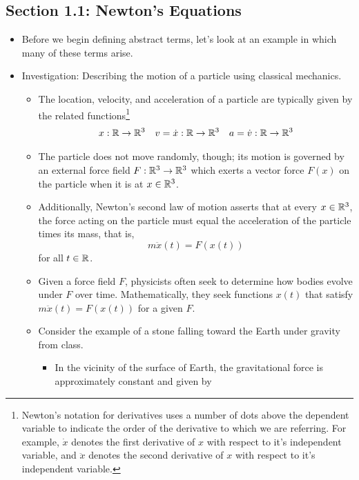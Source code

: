 \documentclass[../notes.tex]{subfiles}
\begin{document}
\subsection*{Section 1.1: Newton's Equations}
\begin{itemize}
    \item {}Before we begin defining abstract terms, let's look at an example in which many of these terms arise.
    \item Investigation: Describing the motion of a particle using classical mechanics.
    \begin{itemize}
        \item The location, velocity, and acceleration of a particle are typically given by the related functions\footnote{Newton's notation for derivatives uses a number of dots above the dependent variable to indicate the order of the derivative to which we are referring. For example, $\dot{x}$ denotes the first derivative of $x$ with respect to it's independent variable, and $\ddot{x}$ denotes the second derivative of $x$ with respect to it's independent variable.}
        \begin{align*}
            x:\mathbb{R}\to\mathbb{R}^3&&
            v=\dot{x}:\mathbb{R}\to\mathbb{R}^3&&
            a=\dot{v}:\mathbb{R}\to\mathbb{R}^3
        \end{align*}
        \item The particle does not move randomly, though; its motion is governed by an external force field $F:\mathbb{R}^3\to\mathbb{R}^3$ which exerts a vector force $F(x)$ on the particle when it is at $x\in\mathbb{R}^3$.
        \item Additionally, Newton's second law of motion asserts that at every $x\in\mathbb{R}^3$, the force acting on the particle must equal the acceleration of the particle times its mass, that is,
        \begin{equation*}
            m\ddot{x}(t) = F(x(t))
        \end{equation*}
        for all $t\in\mathbb{R}$.
        \item Given a force field $F$, physicists often seek to determine how bodies evolve under $F$ over time. Mathematically, they seek functions $x(t)$ that satisfy $m\ddot{x}(t)=F(x(t))$ for a given $F$.
        \item Consider the example of a stone falling toward the Earth under gravity from class.
        \begin{itemize}
            \item In the vicinity of the surface of Earth, the gravitational force is approximately constant and given by

\end{itemize}
\end{itemize}
\end{itemize}
\end{document}
